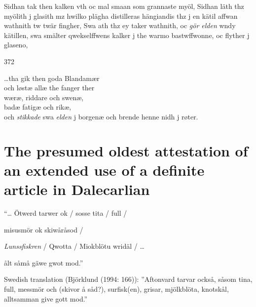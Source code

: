 \begin{styleBodyTextFirst}
Sidhan tak then kalken vth oc mal smaan som grannaste myöl, Sidhan läth thz myölith j glasith mz hwilko plägha distilleras hängiandis thz j en kätil affwan wathnith tw twär fingher, Swa ath thz ey taker wathnith, oc \textit{gör elden} wndy kätillen, swa smälter qwekselffwens kalker j the warmo bastwffwonne, oc flyther j glaseno, 

\end{styleBodyTextFirst}

372

\begin{styleBlockQuote}
…tha gik then goda Blandamær\\
och løstæ allæ the fanger ther\\
wæræ, riddare och swenæ,\\
badæ fatigæ och rikæ,\\
och \textit{stikkade} swa \textit{elden} j borgenæ och brende henne nidh j røter.

\end{styleBlockQuote}

\section{\rmfamily\bfseries The presumed oldest attestation of an extended use of a definite article in Dalecarlian}

\begin{styleListii}
“… Ötwerd tarwer ok / sosse tita / full /

\end{styleListii}

\begin{styleListii}
misusmör ok skiwåråsod /

\end{styleListii}

\begin{styleListii}
\textit{Lunssfiskren} / Qwotta / Miokblötu wridäl / …

\end{styleListii}

\begin{styleListii}
ålt såmå gäwe gwot mod.”

\end{styleListii}

Swedish translation (Björklund (1994: 166)): ”Aftonvard tarvar också, såsom tina, full, messmör och (skivor å såd?), surfisk(en), grisar, mjölkblöta, knotskål, alltsamman give gott mod.”

